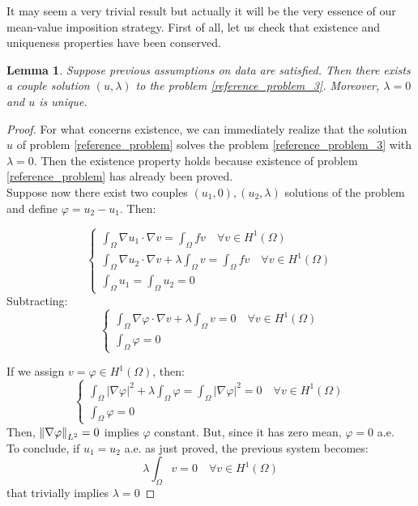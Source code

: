 \documentclass[a4paper,11pt]{article}
\newtheorem{lemma}{Lemma}
\begin{document}
\noindent It may seem a very trivial result but actually it will be the very essence of our mean-value imposition strategy. First of all, let us check that existence and uniqueness properties have been conserved.  \newpage
\begin{lemma} \label{lemma_lagrange}
	Suppose previous assumptions on data are satisfied. Then there exists a couple solution $(u,\lambda)$ to the problem \ref{reference_problem_3}. Moreover, $\lambda=0$ and $u$ is unique. \\
\end{lemma}
\begin{proof}
	For what concerns existence, we can immediately realize that the solution $u$ of problem \ref{reference_problem} solves the problem \ref{reference_problem_3} with $\lambda=0$. Then the existence property holds because existence of problem \ref{reference_problem} has already been proved. \\
	
	\noindent Suppose now there exist two couples $(u_1,0), (u_2,\lambda)$ solutions of the problem and define $\varphi=u_2-u_1$. Then:
	
	\begin{equation*}
	\begin{cases}
	\int_{\Omega}\nabla u_1 \cdot \nabla v = \int_{\Omega} fv \quad \forall v \in H^1(\Omega) \\
	\int_{\Omega}\nabla u_2 \cdot \nabla v + \lambda \int_\Omega v = \int_{\Omega} fv \quad \forall v \in H^1(\Omega) \\
	\int_{\Omega}u_1 = \int_{\Omega}u_2 = 0
	\end{cases}
	\end{equation*}
		Subtracting:
	\begin{equation*}
	\begin{cases}
	\int_{\Omega}\nabla \varphi \cdot \nabla v + \lambda \int_\Omega v = 0 \quad \forall v \in H^1(\Omega) \\
	\int_{\Omega}\varphi = 0
	\end{cases}
	\end{equation*}
	
	\noindent If we assign $v=\varphi \in H^1(\Omega)$, then:
	\begin{equation*}
	\begin{cases}
	\int_{\Omega}|\nabla \varphi|^2 + \lambda \int_\Omega \varphi = \int_{\Omega}|\nabla \varphi|^2 = 0 \quad \forall v \in H^1(\Omega) \\
	\int_{\Omega}\varphi = 0
	\end{cases}
	\end{equation*}
	Then, $\norm{\nabla \varphi}_{L^2} = 0 $ implies $\varphi$ constant. But, since it has zero mean,  $\varphi = 0$ a.e.  \\
	To conclude, if $u_1=u_2$ a.e. as just proved, the previous system becomes:
	\begin{equation*}
	\lambda \int_{\Omega}v = 0 \quad \forall v \in H^1(\Omega)
	\end{equation*}
	that trivially implies $\lambda=0$	
\end{proof}
\end{document}
